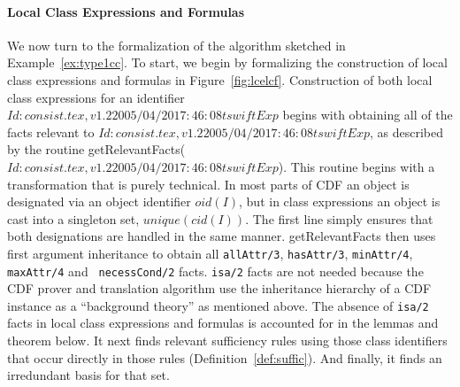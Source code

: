 \paragraph*{Local Class Expressions and Formulas}
We now turn to the formalization of the algorithm sketched in
Example~\ref{ex:type1cc}.  To start, we begin by formalizing the
construction of local class expressions and formulas in
Figure~\ref{fig:lcelcf}.  Construction of both local class expressions
for an identifier $Id: consist.tex,v 1.2 2005/04/20 17:46:08 tswift Exp $ begins with obtaining all of the facts relevant
to $Id: consist.tex,v 1.2 2005/04/20 17:46:08 tswift Exp $, as described by the routine {\sf getRelevantFacts($Id: consist.tex,v 1.2 2005/04/20 17:46:08 tswift Exp $)}.
This routine begins with a transformation that is purely technical.
In most parts of CDF an object is designated via an object identifier
$oid(I)$, but in class expressions an object is cast into a singleton
set, $unique(cid(I))$.  The first line simply ensures that both
designations are handled in the same manner.  {\sf getRelevantFacts}
then uses first argument inheritance to obtain all {\tt allAttr/3},
{\tt hasAttr/3}, {\tt minAttr/4}, {\tt maxAttr/4} and {\tt
necessCond/2} facts.  {\tt isa/2} facts are not needed because the CDF
prover and translation algorithm use the inheritance hierarchy of a
CDF instance as a ``background theory'' as mentioned above.  The
absence of {\tt isa/2} facts in local class expressions and formulas
is accounted for in the lemmas and theorem below. It next finds
relevant sufficiency rules using those class identifiers that occur
directly in those rules (Definition~\ref{def:suffic}).  And finally,
it finds an irredundant basis for that set.

